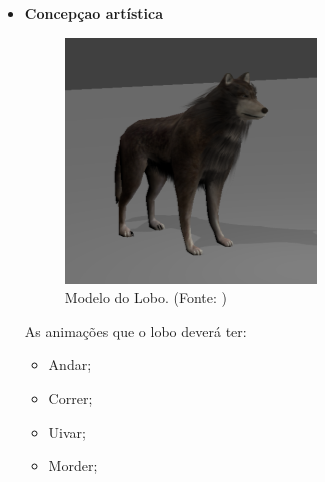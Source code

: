 \begin{itemize}
\newpage
\item {\bf Concepçao artística}

\begin{figure}[H]
 \centering
 \includegraphics[scale=1]{Imagens/lobo01.png}
 \caption{Modelo do Lobo. (Fonte: \cite{bib:lobo01})}
\label{img:lobo}
\end{figure}


As animações que o lobo deverá ter:
\begin{itemize}
\item {Andar;}
\item {Correr;}
\item {Uivar;}
\item {Morder;}

\end{itemize}

\end{itemize}
